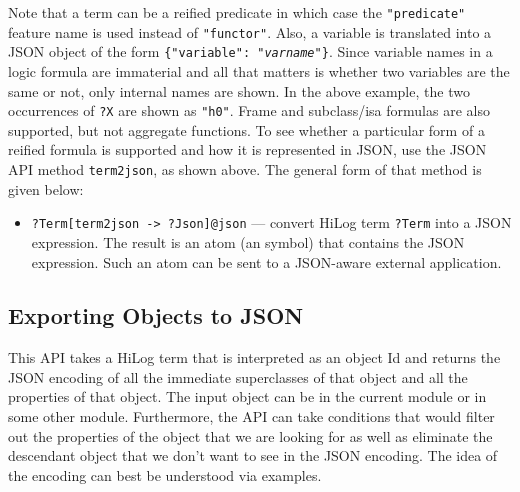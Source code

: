 Note that a term can be a reified predicate in which case the
\texttt{"predicate"} feature name is used instead of \texttt{"functor"}.
Also, a variable is translated into a JSON object of the form
\texttt{\{"variable": "\textnormal{\emph{varname}}"\}}. Since variable names in a logic formula
are immaterial and all that matters is whether two variables are the same
or not, only internal names are shown. In the above example, the two
occurrences of \texttt{?X} are shown as \texttt{"h0"}.
Frame and subclass/isa formulas are also supported, but not aggregate functions.
To see whether a particular form of a reified formula is supported
and how it is represented in JSON, use the JSON API method \texttt{term2json},
as shown above.
The general form of that method is given below:
\begin{itemize}
\item  \texttt{?Term[term2json -> ?Json]@\bs{}json} --- convert HiLog term
  \texttt{?Term} into a JSON expression.   The result is
  an atom (an \ERGO symbol) that contains the JSON expression. Such an atom
  can be sent to a JSON-aware external application.
\end{itemize}

\subsection{Exporting \ERGO Objects to JSON}

This API takes a HiLog term that is interpreted as an object Id and returns
the JSON encoding of all the immediate superclasses of that object and all the
properties of that object.
The input object can be in the current module or in some
other module. Furthermore, the API can take conditions that would filter
out the properties of the object that we are looking for as well as
eliminate the descendant object that we don't want to see in the JSON encoding.
The idea of the encoding can best be understood via examples.

